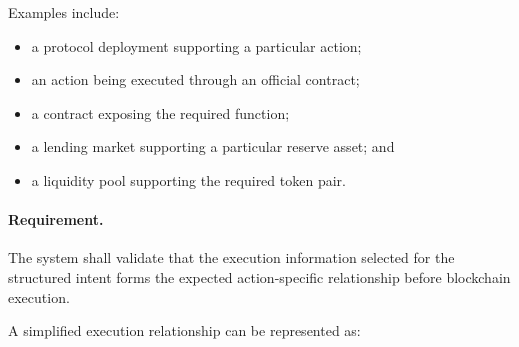 Examples include:

\begin{itemize}
    \item a protocol deployment supporting a particular action;
    \item an action being executed through an official contract;
    \item a contract exposing the required function;
    \item a lending market supporting a particular reserve asset; and
    \item a liquidity pool supporting the required token pair.
\end{itemize}

\paragraph{Requirement.}

The system shall validate that the execution information selected for the
structured intent forms the expected action-specific relationship before
blockchain execution.

A simplified execution relationship can be represented as:



